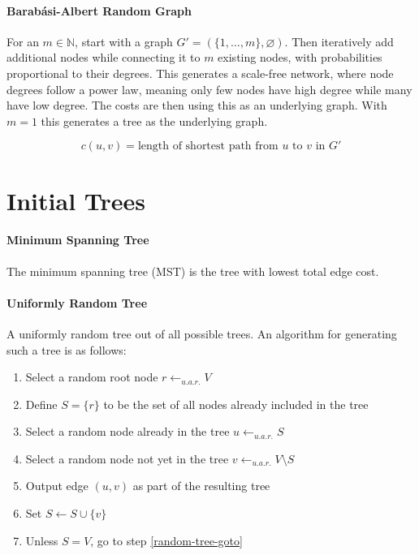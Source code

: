 \documentclass[a4paper, oneside]{discothesis}
\begin{document}
\paragraph{Barabási-Albert Random Graph} For an $m\in\mathbb{N}$, start with a graph $G'=(\{1,\dots,m\},\varnothing)$. Then iteratively add additional nodes while connecting it to $m$ existing nodes, with probabilities proportional to their degrees. This generates a scale-free network, where node degrees follow a power law, meaning only few nodes have high degree while many have low degree. The costs are then using this as an underlying graph. With $m=1$ this generates a tree as the underlying graph.

\begin{equation}
c(u,v)=\text{length of shortest path from $u$ to $v$ in $G'$}
\end{equation}

\section{Initial Trees}
\label{initial-trees}

\paragraph{Minimum Spanning Tree}

The minimum spanning tree (MST) is the tree with lowest total edge cost.

\paragraph{Uniformly Random Tree}

A uniformly random tree out of all possible trees. An algorithm for generating such a tree is as follows:

\begin{enumerate}
\item Select a random root node $r\gets_{u.a.r.}V$
\item Define $S=\{r\}$ to be the set of all nodes already included in the tree
\item Select a random node already in the tree $u\gets_{u.a.r.}S$
\label{random-tree-goto}
\item Select a random node not yet in the tree $v\gets_{u.a.r.}V\setminus S$
\item Output edge $(u,v)$ as part of the resulting tree
\item Set $S\gets S\cup\{v\}$
\item Unless $S=V$, go to step \ref{random-tree-goto}
\end{enumerate}
\end{document}
